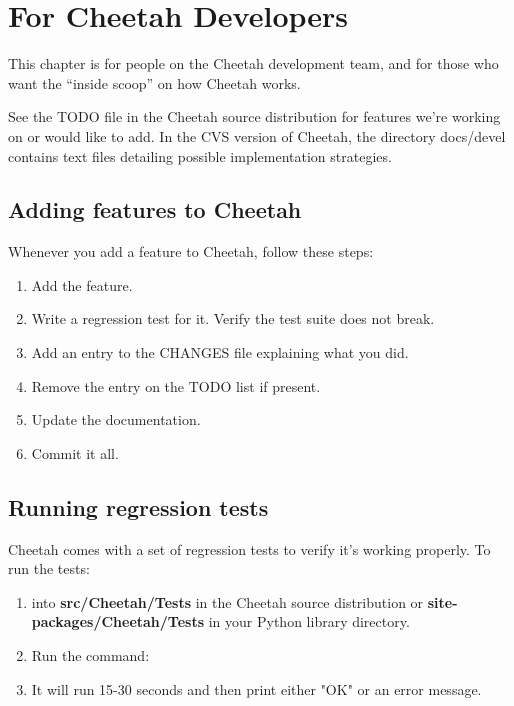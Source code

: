 \section{For Cheetah Developers}
\label{developer}

This chapter is for people on the Cheetah development team, and for those who
want the ``inside scoop'' on how Cheetah works.

See the TODO file in the Cheetah source distribution for features we're
working on or would like to add.  In the CVS version of Cheetah, the directory
docs/devel contains text files detailing possible implementation strategies.

\subsection{Adding features to Cheetah}

Whenever you add a feature to Cheetah, follow these steps:

\begin{enumerate}

\item  Add the feature.

\item  Write a regression test for it.  Verify the test suite does not break.

\item  Add an entry to the CHANGES file explaining what you did.

\item  Remove the entry on the TODO list if present.

\item  Update the documentation.

\item  Commit it all.

\end{enumerate}


\subsection{Running regression tests}

Cheetah comes with a set of regression tests to verify it's working properly.
To run the tests:

\begin{enumerate}

\item  {} into {\bf src/Cheetah/Tests} in the Cheetah source distribution 
     or {\bf site-packages/Cheetah/Tests} in your Python library directory.
     
\item  Run the command:  

\item  It will run 15-30 seconds and then print either "OK" or an error message.

\end{enumerate}

